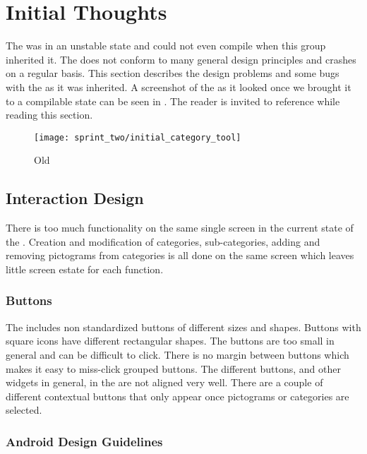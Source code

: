 \section{Initial Thoughts}

The \ct was in an unstable state and could not even compile when this group inherited it. The \ct does not conform to many general design principles and crashes on a regular basis. This section describes the design problems and some bugs with the \ct as it was inherited. A screenshot of the \ct as it looked once we brought it to a compilable state can be seen in . The reader is invited to reference  while reading this section.

\begin{figure}[!htbp]
    \centering
    \texttt{[image: sprint\_two/initial\_category\_tool]}
    \caption{Old \ct}
    \label{fig:category_tool_old}
\end{figure}

\subsection{Interaction Design}

There is too much functionality on the same single screen in the current state of the \ct. Creation and modification of categories, sub-categories, adding and removing pictograms from categories is all done on the same screen which leaves little screen estate for each function.  

\subsubsection{Buttons}

The \ct includes non standardized buttons of different sizes and shapes. Buttons with square icons have different rectangular shapes. The buttons are too small in general and can be difficult to click. There is no margin between buttons which makes it easy to miss-click grouped buttons. The different buttons, and other widgets in general, in the \ct are not aligned very well. There are a couple of different contextual buttons that only appear once pictograms or categories are selected. 

\subsubsection{Android Design Guidelines}

